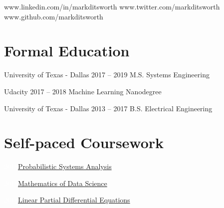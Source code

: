 \documentclass{tccv}
\begin{document}
    {www.linkedin.com/in/markditsworth}
    {www.twitter.com/markditsworth}
    {www.github.com/markditsworth}

\section{Formal Education}

\begin{yearlist} 

\item[University of Texas - Dallas]{2017 -- 2019}
     {M.S. Systems Engineering}{}

\item[Udacity]{2017 -- 2018}
	 {Machine Learning Nanodegree}{}

\item[University of Texas - Dallas]{2013 -- 2017}
     {B.S. Electrical Engineering}{}

\end{yearlist}
\vspace{-30pt}
\section{Self-paced Coursework}
\begin{factlist}
\item{\textcolor{white}{2018}}{\href{https://github.com/markditsworth/psa}{Probabilistic Systems Analysis}}
\item{\textcolor{white}{2018}}{\href{https://github.com/markditsworth/mds}{Mathematics of Data Science}}
\item{\textcolor{white}{2018}}{\href{https://github.com/markditsworth/linearPDE}{Linear Partial Differential Equations}}
\end{factlist}
\end{document}
